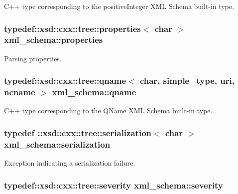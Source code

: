 C++ type corresponding to the positive\-Integer X\-M\-L Schema built-\/in type. 

\hypertarget{namespacexml__schema_a1a8ebac679580b41baebd62c7d641c1d}{
\subsubsection[{properties}]{\setlength{\rightskip}{0pt plus 5cm}typedef\-::xsd\-::cxx\-::tree\-::properties$<$ char $>$ {\bf xml\-\_\-schema\-::properties}}}\label{namespacexml__schema_a1a8ebac679580b41baebd62c7d641c1d}


Parsing properties. 

\hypertarget{namespacexml__schema_a5343b1a86a36b809f1acf953a2497af2}{
\subsubsection[{qname}]{\setlength{\rightskip}{0pt plus 5cm}typedef\-::xsd\-::cxx\-::tree\-::qname$<$ char, {\bf simple\-\_\-type}, {\bf uri}, {\bf ncname} $>$ {\bf xml\-\_\-schema\-::qname}}}\label{namespacexml__schema_a5343b1a86a36b809f1acf953a2497af2}


C++ type corresponding to the Q\-Name X\-M\-L Schema built-\/in type. 

\hypertarget{namespacexml__schema_a40e04a11c9e6204762591b4de3755899}{
\subsubsection[{serialization}]{\setlength{\rightskip}{0pt plus 5cm}typedef \-::xsd\-::cxx\-::tree\-::serialization$<$ char $>$ {\bf xml\-\_\-schema\-::serialization}}}\label{namespacexml__schema_a40e04a11c9e6204762591b4de3755899}


Exception indicating a serialization failure. 

\hypertarget{namespacexml__schema_a7d2d246dda9239f18f1866a1cdb4022e}{
\subsubsection[{severity}]{\setlength{\rightskip}{0pt plus 5cm}typedef\-::xsd\-::cxx\-::tree\-::severity {\bf xml\-\_\-schema\-::severity}}}\label{namespacexml__schema_a7d2d246dda9239f18f1866a1cdb4022e}


